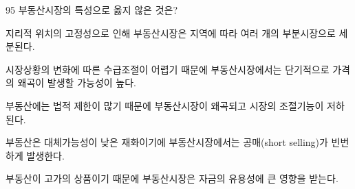 \begin{question}{95}
부동산시장의 특성으로 옳지 않은 것은?
\begin{choices}
  \item 지리적 위치의 고정성으로 인해 부동산시장은 지역에 따라 여러 개의 부분시장으로 세분된다.
  \item 시장상황의 변화에 따른 수급조절이 어렵기 때문에 부동산시장에서는 단기적으로 가격의 왜곡이 발생할 가능성이 높다.
  \item 부동산에는 법적 제한이 많기 때문에 부동산시장이 왜곡되고 시장의 조절기능이 저하된다.
  \item 부동산은 대체가능성이 낮은 재화이기에 부동산시장에서는 공매(short selling)가 빈번하게 발생한다.
  \item 부동산이 고가의 상품이기 때문에 부동산시장은 자금의 유용성에 큰 영향을 받는다.
\end{choices}
\end{question}
